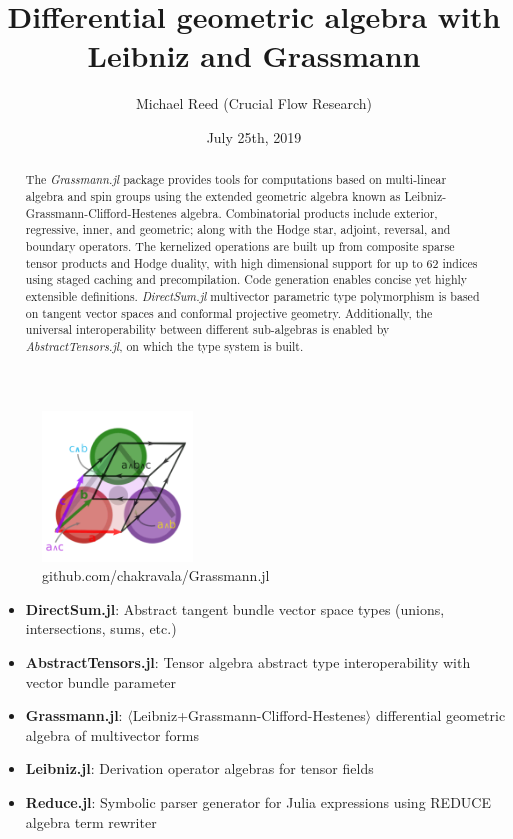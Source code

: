 \documentclass{juliacon}
\author{Michael Reed (Crucial Flow Research)}
\title{Differential geometric algebra with Leibniz and Grassmann}
\date{July 25th, 2019}
\begin{document}
%

\maketitle
\begin{figure}[ht]
\centerline{\includegraphics[width=4cm]{../docs/src/assets/logo.png}}
\caption*{github.com/chakravala/Grassmann.jl}
\end{figure}
\begin{abstract}
	The \textit{Grassmann.jl}
	package provides tools for computations based on multi-linear algebra and spin groups using the extended geometric algebra known as Leibniz-Grassmann-Clifford-Hestenes algebra.
	Combinatorial products include
	exterior, regressive, inner, and geometric; along with the Hodge star, adjoint, reversal, and boundary operators.
	The kernelized operations are built up from composite sparse tensor products and Hodge duality, with high dimensional support for up to 62 indices using staged caching and precompilation. Code generation enables concise yet highly extensible definitions.
	\textit{DirectSum.jl}
	multivector parametric type polymorphism is based on tangent vector spaces and conformal projective geometry.
	Additionally, the universal interoperability between different sub-algebras is enabled by \textit{AbstractTensors.jl},
	on which the type system is built.
\end{abstract}
\begin{itemize}
	\item \textbf{DirectSum.jl}: Abstract tangent bundle vector space types (unions, intersections, sums, etc.)
	\item \textbf{AbstractTensors.jl}: Tensor algebra abstract type interoperability with vector bundle parameter
	\item \textbf{Grassmann.jl}: $\langle$Leibniz+Grassmann-Clifford-Hestenes$\rangle$ differential geometric algebra of multivector forms
	\item \textbf{Leibniz.jl}: Derivation operator algebras for tensor fields
	\item \textbf{Reduce.jl}: Symbolic parser generator for Julia expressions using REDUCE algebra term rewriter
\end{itemize}
\end{document}
